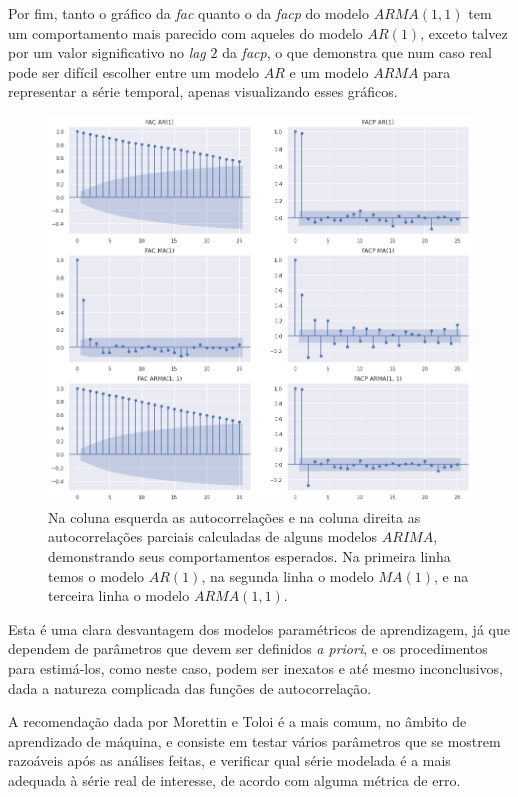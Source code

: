 Por fim, tanto o gráfico da \emph{fac} quanto o da \emph{facp} do modelo  $ARMA(1, 1)$ tem um comportamento mais parecido com aqueles do modelo $AR(1)$, exceto talvez por um valor significativo no \emph{lag} $2$ da \emph{facp}, o que demonstra que num caso real pode ser difícil escolher entre um modelo $AR$ e um modelo $ARMA$ para representar a série temporal, apenas visualizando esses gráficos.

\begin{figure}[htb]
\centering
\includegraphics[width=14cm]{figuras/parciais}
\caption{Na coluna esquerda as autocorrelações e na coluna direita as autocorrelações parciais calculadas de alguns modelos $ARIMA$, demonstrando seus comportamentos esperados. Na primeira linha temos o modelo $AR(1)$, na segunda linha o modelo $MA(1)$, e na terceira linha o modelo $ARMA(1,1)$.}
\label{fig:parciais}
\end{figure}

Esta é uma clara desvantagem dos modelos paramétricos de aprendizagem, já que dependem de parâmetros que devem ser definidos \emph{a priori}, e os procedimentos para estimá-los, como neste caso, podem ser inexatos e até mesmo inconclusivos, dada a natureza complicada das funções de autocorrelação.

A recomendação dada por Morettin e Toloi \citep{morettin} é a mais comum, no âmbito de aprendizado de máquina, e consiste em testar vários parâmetros que se mostrem razoáveis após as análises feitas, e verificar qual série modelada é a mais adequada à série real de interesse, de acordo com alguma métrica de erro.